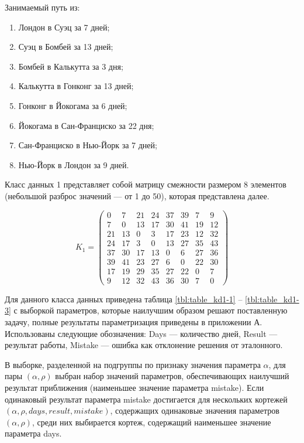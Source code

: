 Занимаемый путь из:
\begin{enumerate}
	\item Лондон в Суэц за 7 дней;
	\item Суэц в Бомбей за 13 дней;
	\item Бомбей в Калькутта за 3 дня;
	\item Калькутта в Гонконг за 13 дней;
	\item Гонконг в Йокогама за 6 дней;
	\item Йокогама в Сан-Франциско за 22 дня;
	\item Сан-Франциско в Нью-Йорк за 7 дней;
	\item Нью-Йорк в Лондон за 9 дней.
\end{enumerate}

Класс данных 1 представляет собой матрицу смежности размером 8 элементов (небольшой разброс значений --- от 1 до 50), которая представлена далее.

\begin{equation}
	\label{eq:kd1}
	K_{1} = \begin{pmatrix}
		0 & 7 & 21 & 24 & 37 & 39 & 7 & 9 \\ 
		7 & 0 & 13 & 17 & 30 & 41 & 19 & 12 \\ 
		21 & 13 & 0 & 3 & 17 & 23 & 12 & 32 \\ 
		24 & 17 & 3 & 0 & 13 & 27 & 35 & 43 \\ 
		37 & 30 & 17 & 13 & 0 & 6 & 27 & 36 \\ 
		39 & 41 & 23 & 27 & 6 & 0 & 22 & 30 \\ 
		17 & 19 & 29 & 35 & 27 & 22 & 0 & 7 \\ 
		9 & 12 & 32 & 43 & 36 & 30 & 7 & 0 
	\end{pmatrix}
\end{equation}

Для данного класса данных приведена таблица \ref{tbl:table_kd1-1} -- \ref{tbl:table_kd1-3}	с выборкой параметров, которые наилучшим образом решают поставленную задачу, полные результаты параметризация приведены в приложении А. 
Использованы следующие обозначения: Days --- количество дней, Result --- результат работы, Mistake --- ошибка как отклонение решения от эталонного.

В выборке, разделенной на подгруппы по признаку значения параметра $\alpha$, для пары $(\alpha, \rho)$ выбран набор значений параметров, обеспечивающих наилучший результат приближения (наименьшее значение параметра mistake).
Если одинаковый результат параметра mistake достигается для нескольких кортежей $(\alpha, \rho, days, result, mistake)$, содержащих одинаковые значения параметров $(\alpha, \rho)$, среди них выбирается кортеж, содержащий наименьшее значение параметра days.

